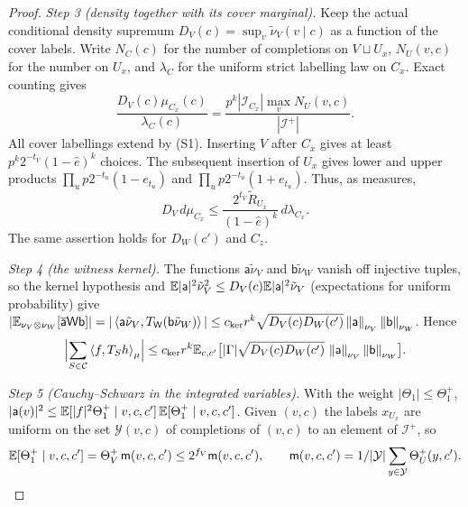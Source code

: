 \begin{proof}
\emph{Step 3 (density together with its cover marginal).}
Keep the actual conditional density supremum
$D_V(c)=\sup_v\tilde\nu_V(v\mid c)$ as a function of the cover labels.
Write $N_C(c)$ for the number of completions on $V\sqcup U_x$,
$N_U(v,c)$ for the number on $U_x$, and $\lambda_C$ for the uniform
strict labelling law on $C_x$. Exact counting gives
\[
 \frac{D_V(c)\mu_{C_x}(c)}{\lambda_C(c)}
 =\frac{p^k|\mathcal I_{C_x}|\max_v N_U(v,c)}{|\mathcal I^+|}.
\]
All cover labellings extend by (S1). Inserting $V$ after $C_x$ gives
at least $p^k2^{-t_V}(1-\hat e)^k$ choices. The subsequent insertion
of $U_x$ gives lower and upper products
$\prod_up2^{-t_u}(1-e_{t_u})$ and
$\prod_up2^{-t_u}(1+e_{t_u})$. Thus, as measures,
\begin{equation}\label{eq:extraction:cross-density}
 D_V\,d\mu_{C_x}\le
 \frac{2^{t_V}\widetilde R_{U_x}}{(1-\hat e)^k}\,d\lambda_{C_x}.
\end{equation}
The same assertion holds for $D_W(c')$ and $C_z$.

\emph{Step 4 (the witness kernel).} The functions $\mathsf a\tilde\nu_V$ and
$\mathsf b\tilde\nu_W$ vanish off injective tuples, so the kernel hypothesis and
$\mathbb E|\mathsf a|^2\tilde\nu_V^2\le D_V(c)\mathbb E|\mathsf a|^2\tilde\nu_V$ (expectations for
uniform probability) give
$|\mathbb E_{\nu_V\otimes\nu_W}[\overline{\mathsf a}\mathsf W\mathsf b]|
=|\left\langle \mathsf a\tilde\nu_V,T_{\mathsf W}(\mathsf b\tilde\nu_W)\right\rangle|
\le c_{\rm ker}r^k\sqrt{D_V(c)D_W(c')}\left\|\mathsf a\right\|_{\nu_V}\left\|\mathsf b\right\|_{\nu_W}$.
Hence
\begin{equation}\label{eq:extraction:step4}
 \Bigl|\sum_{S\in\mathcal C}\left\langle f,T_Sh\right\rangle_\mu\Bigr|\le c_{\rm ker}r^k
 \mathbb E_{c,c'}\bigl[|\Gamma|\sqrt{D_V(c)D_W(c')}\,
       \left\|\mathsf a\right\|_{\nu_V}\left\|\mathsf b\right\|_{\nu_W}\bigr].
\end{equation}

\emph{Step 5 (Cauchy--Schwarz in the integrated variables).} With the weight
$|\Theta_1|\le\Theta^+_1$,
$|\mathsf a(v)|^2\le\mathbb E[|f|^2\Theta^+_1\mid v,c,c']\,\mathbb E[\Theta^+_1\mid v,c,c']$. Given
$(v,c)$ the labels $x_{U_x}$ are uniform on the set $\mathcal Y(v,c)$ of completions
of $(v,c)$ to an element of $\mathcal I^+$, so
\[
 \mathbb E[\Theta^+_1\mid v,c,c']=\Theta^+_V\,\mathsf m(v,c,c')\le2^{f_V}\mathsf m(v,c,c'),
 \qquad\mathsf m(v,c,c')=1/|\mathcal Y|\sum_{y\in\mathcal Y}\Theta^+_U(y,c').
\]


\end{proof}
